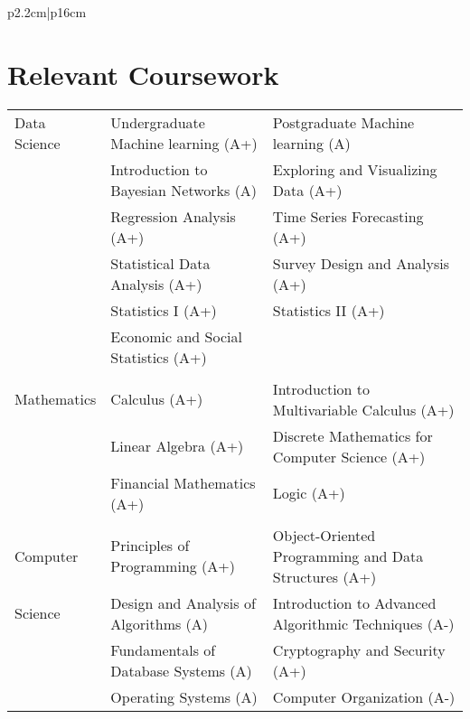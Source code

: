 \documentclass[10pt, oneside]{article}
\begin{document}
\begin{tabularx}{\linewidth}{p{2.2cm}|p{16cm}}
\begin{itemize}
	\end{itemize}
\end{tabularx}





\section*{Relevant Coursework}
\begin{tabularx}{\linewidth}{p{2.2cm}|p{7cm} p{9cm}}
	\toprule 
	Data Science
	&
	Undergraduate Machine learning (A+) & Postgraduate Machine learning (A)\\
	&
	Introduction to Bayesian Networks (A) & Exploring and Visualizing Data (A+)\\
	&
	Regression Analysis (A+) & Time Series Forecasting (A+)\\
	&
	Statistical Data Analysis (A+) & Survey Design and Analysis (A+)\\	
	&
	Statistics I (A+) & Statistics II (A+) \\
	&
	Economic and Social Statistics (A+) 
	\\\\
	Mathematics &
	Calculus (A+) & Introduction to Multivariable Calculus (A+)\\
	& Linear Algebra (A+) & Discrete Mathematics for Computer Science (A+)\\
	& Financial Mathematics (A+) & Logic (A+) 
	\\\\
	Computer 
	&
	Principles of Programming (A+) & Object-Oriented Programming and Data Structures (A+)\\
	Science & Design and Analysis of Algorithms (A) & Introduction to Advanced Algorithmic Techniques (A-)\\
	& Fundamentals of Database Systems (A) & Cryptography and Security (A+)\\
	& Operating Systems (A) & Computer Organization (A-)\\
\end{tabularx}
\end{document}
